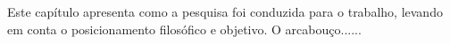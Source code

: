 \vspace{-2cm}

Este capítulo apresenta como a pesquisa foi conduzida para o trabalho, levando em conta o posicionamento filosófico e objetivo. O arcabouço......